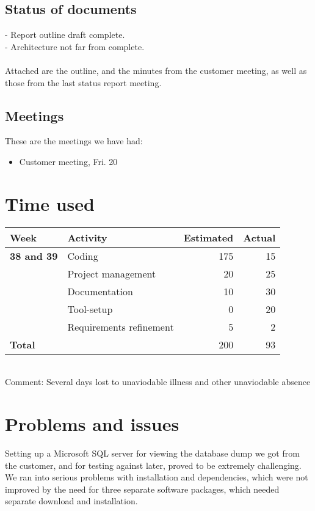 \documentclass[12pt, a4paper]{article}
\begin{document}
\subsection{Status of documents}
- Report outline draft complete.\\
- Architecture not far from complete.
\\\\
Attached are the outline, and the minutes from the customer meeting, as well as those from the last status report meeting.
\subsection{Meetings}
These are the meetings we have had:
\begin{itemize}
\item Customer meeting, Fri. 20
\end{itemize}
\section{Time used}
  \begin{tabular}{| l | l | r | r |}
    \hline
    \textbf{Week} & \textbf{Activity} & \textbf{Estimated} & \textbf{Actual}\\ \hline
    \textbf{38 and 39} & Coding & 175 & 15 \\ \hline
     & Project management & 20 & 25 \\ \hline
     & Documentation & 10 & 30 \\ \hline
     & Tool-setup & 0 & 20 \\ \hline
     & Requirements refinement & 5 & 2 \\ \hline
     \textbf{Total }&  & 200 & 93 \\
    \hline
  \end{tabular}
\\Comment: Several days lost to unaviodable illness and other unaviodable absence

\section{Problems and issues}
Setting up a Microsoft SQL server for viewing the database dump we got from the customer,
and for testing against later, proved to be extremely challenging. We ran into serious problems
with installation and dependencies, which were not improved by the need for three separate software
packages, which needed separate download and installation.
\end{document}
